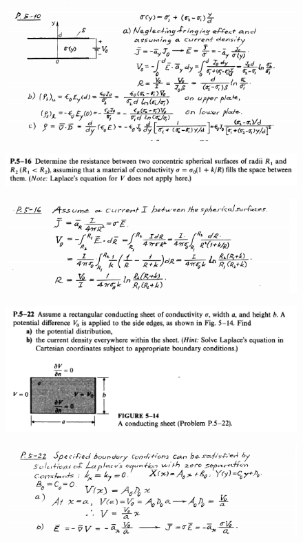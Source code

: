 \documentclass[xcolor={dvipsnames}]{beamer}
\begin{document}
\begin{frame}
\begin{figure}[H]
	\centering
	\includegraphics[width=0.9\linewidth]{5_10.png}
\end{figure}

\end{frame}
\begin{frame}
\begin{figure}[H]
	\centering
	\includegraphics[width=0.9\linewidth]{5_11.png}
\end{figure}
\pause
\begin{figure}[H]
	\centering
	\includegraphics[width=0.9\linewidth]{5_12.png}
\end{figure}
\end{frame}
\begin{frame}
\begin{figure}[H]
	\centering
	\includegraphics[width=0.9\linewidth]{5_13.png}
\end{figure}
\pause
\begin{figure}[H]
	\centering
	\includegraphics[width=0.9\linewidth]{5_14.png}
\end{figure}
\end{frame}
\end{document}
